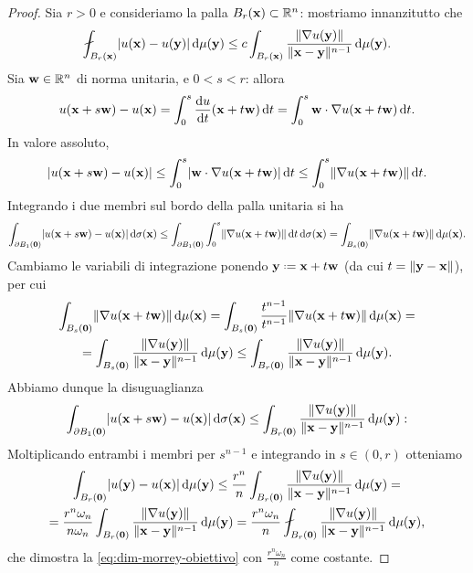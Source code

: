 \begin{proof}
    Sia $r>0$ e consideriamo la palla $B_r(\mathbf{x})\subset\mathbb{R}^n$: mostriamo innanzitutto che
    \begin{equation}
        \avint_{B_r(\vec x)}\abs{u(\vec x)-u(\vec y)}\,\dd\mu(\vec y)\le c\int_{B_r(\vec x)}\frac{\norm{\grad u(\vec y)}}{\norm{\vec x-\vec y}^{n-1}}\,\dd\mu(\vec y).
        \label{eq:dim-morrey-obiettivo}
    \end{equation}
    Sia $\mathbf{w}\in\mathbb{R}^n$ di norma unitaria, e $0<s<r$: allora
    \begin{equation}
        u(\mathbf{x}+s\mathbf{w})-u(\mathbf{x})=
        \int_0^s\frac{\textup{d} {u}}{\textup{d} {t}}(\mathbf{x}+t\mathbf{w})\,\textup{d} t=
        \int_0^s{\mathbf{w}}\cdot{\nabla u(\mathbf{x}+t\mathbf{w})}\,\textup{d} t.
    \end{equation}
    In valore assoluto,
    \begin{equation}
        \lvert u(\mathbf{x}+s\mathbf{w})-u(\mathbf{x})\rvert\le
        \int_0^s\lvert{\mathbf{w}}\cdot{\nabla u(\mathbf{x}+t\mathbf{w})}\rvert\,\textup{d} t\le
        \int_0^s\lVert\nabla u(\mathbf{x}+t\mathbf{w})\rVert\,\textup{d} t.
    \end{equation}
    Integrando i due membri sul bordo della palla unitaria si ha
    \begin{equation}
        \int_{\partial B_1(\mathbf{0})} \lvert u(\mathbf{x}+s\mathbf{w})-u(\mathbf{x})\rvert\,\textup{d}\sigma(\mathbf{x})\le
        \int_{\partial B_1(\mathbf{0})}\int_0^s \lVert\nabla u(\mathbf{x}+t\mathbf{w})\rVert\,\textup{d} t\,\textup{d}\sigma(\mathbf{x})=
        \int_{B_s(\mathbf{0})} \lVert\nabla u(\mathbf{x}+t\mathbf{w})\rVert\,\textup{d}\mu(\mathbf{x}).
    \end{equation}
    Cambiamo le variabili di integrazione ponendo $\vec y\defeq\vec x+t\vec w$ (da cui $t=\lVert\mathbf{y}-\mathbf{x}\rVert$), per cui
    \begin{multline}
        \int_{B_s(\mathbf{0})} \lVert\nabla u(\mathbf{x}+t\mathbf{w})\rVert\,\textup{d}\mu(\mathbf{x})=
        \int_{B_s(\mathbf{0})} \frac{t^{n-1}}{t^{n-1}}\lVert\nabla u(\mathbf{x}+t\mathbf{w})\rVert\,\textup{d}\mu(\mathbf{x})=\\=
        \int_{B_s(\mathbf{0})} \frac{\lVert\nabla u(\mathbf{y})\rVert}{\lVert\mathbf{x}-\mathbf{y}\rVert^{n-1}}\,\textup{d}\mu(\mathbf{y})\le
        \int_{B_r(\mathbf{0})} \frac{\lVert\nabla u(\mathbf{y})\rVert}{\lVert\mathbf{x}-\mathbf{y}\rVert^{n-1}}\,\textup{d}\mu(\mathbf{y}).
    \end{multline}
    Abbiamo dunque la disuguaglianza 
    \begin{equation}
        \int_{\partial B_1(\mathbf{0})} \lvert u(\mathbf{x}+s\mathbf{w})-u(\mathbf{x})\rvert\,\textup{d}\sigma(\mathbf{x})\le
        \int_{B_r(\mathbf{0})} \frac{\lVert\nabla u(\mathbf{y})\rVert}{\lVert\mathbf{x}-\mathbf{y}\rVert^{n-1}}\,\textup{d}\mu(\mathbf{y}):
    \end{equation}
    Moltiplicando entrambi i membri per $s^{n-1}$ e integrando in $s\in(0,r)$ otteniamo
    \begin{multline}
        \int_{B_r(\vec 0)}\abs{u(\vec y)-u(\vec x)}\,\dd\mu(\vec y)\le
        \frac{r^n}{n}\int_{B_r(\vec 0)}\frac{\norm{\grad u(\vec y)}}{\norm{\vec x-\vec y}^{n-1}}\,\dd\mu(\vec y)=\\=
        \frac{r^n\omega_n}{n\omega_n}\int_{B_r(\vec 0)}\frac{\norm{\grad u(\vec y)}}{\norm{\vec x-\vec y}^{n-1}}\,\dd\mu(\vec y)=
        \frac{r^n\omega_n}{n}\avint_{B_r(\vec 0)}\frac{\norm{\grad u(\vec y)}}{\norm{\vec x-\vec y}^{n-1}}\,\dd\mu(\vec y),
    \end{multline}
    che dimostra la \eqref{eq:dim-morrey-obiettivo} con $\frac{r^n\omega_n}{n}$ come costante.


\end{proof}
